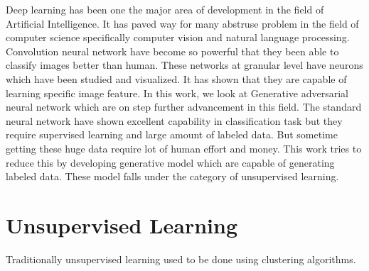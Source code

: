 


Deep learning has been one the major area of development in the field of Artificial Intelligence. It has paved way for many abstruse problem in the field of computer science specifically computer vision and natural language processing. Convolution neural network have become so powerful that they been able to classify images better than human. These networks at granular level have neurons which have been studied and visualized. It has shown that they are capable of learning specific image feature. In this work, we look at Generative adversarial neural network which are on step further advancement in this field. The standard neural network have shown excellent capability in classification task but they require supervised learning and large amount of labeled data. But sometime getting these huge data require lot of human effort and money. This work tries to reduce this by developing generative model which are capable of generating labeled data. These model falls under the category of unsupervised learning. 
\section{Unsupervised Learning}

Traditionally unsupervised learning used to be done using clustering algorithms.